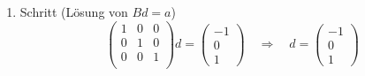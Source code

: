 \documentclass[a4paper]{scrartcl}
\begin{document}
\begin{enumerate}[label=\bfseries\arabic*.]
\begin{enumerate}
\begin{enumerate}[1.]
\begin{enumerate}[1.]
                            \item Schritt (Lösung von $Bd = a$)
                                \begin{equation}
                                    \begin{pmatrix}
                                        1 & 0 & 0 \\
                                        0 & 1 & 0 \\
                                        0 & 0 & 1 \\
                                    \end{pmatrix}
                                    d
                                    =
                                    \begin{pmatrix}
                                        -1 \\ 0 \\ 1
                                    \end{pmatrix}
                                    \quad\Rightarrow\quad
                                    d =
                                    \begin{pmatrix}
                                        -1 \\ 0 \\ 1
                                    \end{pmatrix}
                                \end{equation}


\end{enumerate}
\end{enumerate}
\end{enumerate}
\end{enumerate}
\end{document}
